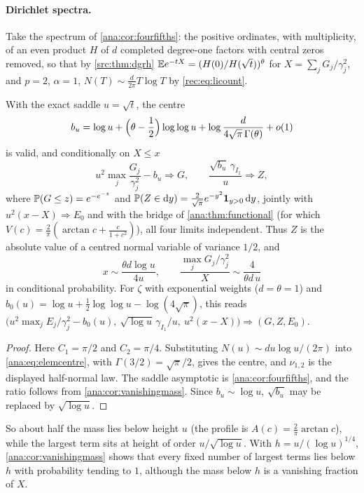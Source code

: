 \paragraph{Dirichlet spectra.}
Take the spectrum of \cref{ana:cor:fourfifths}: the positive ordinates, with multiplicity, of an even
product $H$ of $d$ completed degree-one factors with central zeros removed, so that by
\cref{src:thm:dgrh} $\mathbb{E} e^{-tX}=(H(0)/H(\sqrt t))^\theta$ for $X=\sum_jG_j/\gamma_j^2$, and
$p=2$, $\alpha=1$, $N(T)\sim\frac d{2\pi}T\log T$ by \eqref{rec:eq:licount}.

\begin{corollary}\label{ana:cor:dirextremes}
With the exact saddle $u=\sqrt t$, the centre
\[
 b_u=\log u+\Bigl(\theta-\frac12\Bigr)\log\log u+\log\frac d{4\sqrt\pi\,\Gamma(\theta)}+o(1)
\]
is valid, and conditionally on $X\le x$
\[
 u^2\max_j\frac{G_j}{\gamma_j^2}-b_u\Longrightarrow G,\qquad
 \frac{\sqrt{b_u}\,\gamma_{I_1}}u\Longrightarrow Z,
\]
where $\mathbb{P}(G\le z)=e^{-e^{-z}}$ and $\mathbb{P}(Z\in\mathrm{d} y)=\frac2{\sqrt\pi}e^{-y^2}\mathbf{1}_{y>0}\,\mathrm{d} y$,
jointly with $u^2(x-X)\Rightarrow E_0$ and with the bridge of \cref{ana:thm:functional} (for which
$V(c)=\frac2\pi(\arctan c+\frac c{1+c^2})$), all four limits independent. Thus $Z$ is the absolute value of
a centred normal variable of variance $1/2$, and
\[
 x\sim\frac{\theta d\log u}{4u},\qquad\frac{\max_jG_j/\gamma_j^2}X\sim\frac4{\theta d\,u}
\]
in conditional probability. For $\zeta$ with exponential weights ($d=\theta=1$) and
$b_0(u)=\log u+\frac12\log\log u-\log(4\sqrt\pi)$, this reads
$\bigl(u^2\max_jE_j/\gamma_j^2-b_0(u),\ \sqrt{\log u}\,\gamma_{I_1}/u,\ u^2(x-X)\bigr)\Rightarrow(G,Z,E_0)$.
\end{corollary}

\begin{proof}
Here $C_1=\pi/2$ and $C_2=\pi/4$. Substituting $N(u)\sim du\log u/(2\pi)$ into \eqref{ana:eq:elemcentre},
with $\Gamma(3/2)=\sqrt\pi/2$, gives the centre, and $\nu_{1,2}$ is the displayed half-normal law. The
saddle asymptotic is \cref{ana:cor:fourfifths}, and the ratio follows from
\cref{ana:cor:vanishingmass}. Since $b_u\sim\log u$, $\sqrt{b_u}$ may be replaced by $\sqrt{\log u}$.
\end{proof}

So about half the mass lies below height $u$ (the profile is $A(c)=\frac2\pi\arctan c$), while the largest
term sits at height of order $u/\sqrt{\log u}$. With $h=u/(\log u)^{1/4}$, \cref{ana:cor:vanishingmass}
shows that every fixed number of largest terms lies below $h$ with probability tending to $1$, although
the mass below $h$ is a vanishing fraction of $X$.

